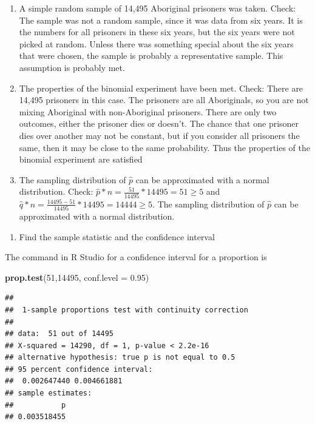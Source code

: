 \documentclass[
]{book}
\newenvironment{Shaded}{\begin{snugshade}}{\end{snugshade}}
\newcommand{\DataTypeTok}[1]{\textcolor[rgb]{0.13,0.29,0.53}{#1}}
\newcommand{\DecValTok}[1]{\textcolor[rgb]{0.00,0.00,0.81}{#1}}
\newcommand{\FloatTok}[1]{\textcolor[rgb]{0.00,0.00,0.81}{#1}}
\newcommand{\KeywordTok}[1]{\textcolor[rgb]{0.13,0.29,0.53}{\textbf{#1}}}
\newcommand{\NormalTok}[1]{#1}
\providecommand{\tightlist}{%
  \setlength{\itemsep}{0pt}\setlength{\parskip}{0pt}}
\begin{document}
\begin{enumerate}
\def\labelenumi{\alph{enumi}.}
\item
  A simple random sample of 14,495 Aboriginal prisoners was taken. Check: The sample was not a random sample, since it was data from six years. It is the numbers for all prisoners in these six years, but the six years were not picked at random. Unless there was something special about the six years that were chosen, the sample is probably a representative sample. This assumption is probably met.
\item
  The properties of the binomial experiment have been met. Check: There are 14,495 prisoners in this case. The prisoners are all Aboriginals, so you are not mixing Aboriginal with non-Aboriginal prisoners. There are only two outcomes, either the prisoner dies or doesn't. The chance that one prisoner dies over another may not be constant, but if you consider all prisoners the same, then it may be close to the same probability. Thus the properties of the binomial experiment are satisfied
\item
  The sampling distribution of \(\hat{p}\) can be approximated with a normal distribution. Check: \(\hat{p}*n=\frac{51}{14495}*14495=51\ge5\) and \(\hat{q}*n=\frac{14495-51}{14495}*14495=14444\ge5\). The sampling distribution of \(\hat{p}\) can be approximated with a normal distribution.
\end{enumerate}

\begin{enumerate}
\def\labelenumi{\arabic{enumi}.}
\setcounter{enumi}{2}
\tightlist
\item
  Find the sample statistic and the confidence interval
\end{enumerate}

The command in R Studio for a confidence interval for a proportion is

\begin{Shaded}
\begin{Highlighting}[]
\KeywordTok{prop.test}\NormalTok{(}\DecValTok{51}\NormalTok{,}\DecValTok{14495}\NormalTok{, }\DataTypeTok{conf.level =} \FloatTok{0.95}\NormalTok{)}
\end{Highlighting}
\end{Shaded}

\begin{verbatim}
## 
##  1-sample proportions test with continuity correction
## 
## data:  51 out of 14495
## X-squared = 14290, df = 1, p-value < 2.2e-16
## alternative hypothesis: true p is not equal to 0.5
## 95 percent confidence interval:
##  0.002647440 0.004661881
## sample estimates:
##           p 
## 0.003518455
\end{verbatim}
\end{document}
